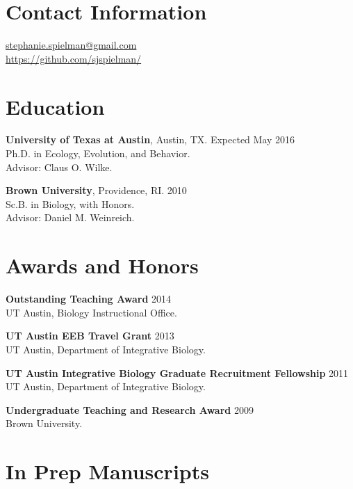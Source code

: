 \documentclass[line, margin]{res}
\begin{document}


\begin{resume}
\vspace{0.5cm}
\section{Contact Information}
	\href{mailto:stephanie.spielman@gmail.com}{stephanie.spielman@gmail.com} \\
	\url{https://github.com/sjspielman/}
	
\vspace{0.75cm}
	
\section{Education}

\textbf{University of Texas at Austin}, Austin, TX. \hfill Expected May 2016 \\ Ph.D. in Ecology, Evolution, and Behavior. \\ Advisor: Claus O. Wilke.


\textbf{Brown University}, Providence, RI.  \hfill 2010 \\ Sc.B. in Biology, with Honors. \\ Advisor: Daniel M. Weinreich.

\vspace{0.75cm}

\section{Awards and Honors}

\textbf{Outstanding Teaching Award} \hfill 2014 \\ UT Austin, Biology Instructional Office.

\textbf{UT Austin EEB Travel Grant} \hfill 2013 \\ UT Austin, Department of Integrative Biology.

\textbf{UT Austin Integrative Biology Graduate Recruitment Fellowship} \hfill 2011 \\ UT Austin, Department of Integrative Biology.

\textbf{Undergraduate Teaching and Research Award} \hfill 2009 \\ Brown University.

\vspace{0.75cm}
		
		
\section{In Prep Manuscripts}


\end{resume}
\end{document}

